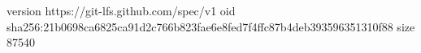 version https://git-lfs.github.com/spec/v1
oid sha256:21b0698ca6825ca91d2c766b823fae6e8fed7f4ffc87b4deb393596351310f88
size 87540
